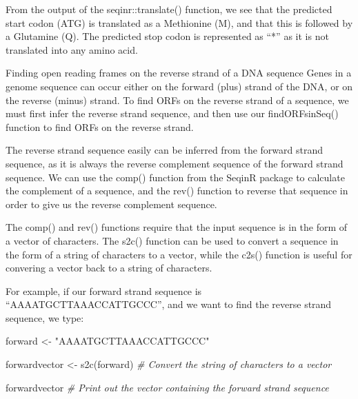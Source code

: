\documentclass[
]{book}
\newenvironment{Shaded}{\begin{snugshade}}{\end{snugshade}}
\newcommand{\CommentTok}[1]{\textcolor[rgb]{0.56,0.35,0.01}{\textit{#1}}}
\newcommand{\FunctionTok}[1]{\textcolor[rgb]{0.00,0.00,0.00}{#1}}
\newcommand{\NormalTok}[1]{#1}
\newcommand{\OtherTok}[1]{\textcolor[rgb]{0.56,0.35,0.01}{#1}}
\newcommand{\StringTok}[1]{\textcolor[rgb]{0.31,0.60,0.02}{#1}}
\begin{document}
From the output of the seqinr::translate() function, we see that the predicted start codon (ATG) is translated as a Methionine (M), and that this is followed by a Glutamine (Q). The predicted stop codon is represented as ``*'' as it is not translated into any amino acid.

Finding open reading frames on the reverse strand of a DNA sequence
Genes in a genome sequence can occur either on the forward (plus) strand of the DNA, or on the reverse (minus) strand. To find ORFs on the reverse strand of a sequence, we must first infer the reverse strand sequence, and then use our findORFsinSeq() function to find ORFs on the reverse strand.

The reverse strand sequence easily can be inferred from the forward strand sequence, as it is always the reverse complement sequence of the forward strand sequence. We can use the comp() function from the SeqinR package to calculate the complement of a sequence, and the rev() function to reverse that sequence in order to give us the reverse complement sequence.

The comp() and rev() functions require that the input sequence is in the form of a vector of characters. The s2c() function can be used to convert a sequence in the form of a string of characters to a vector, while the c2s() function is useful for convering a vector back to a string of characters.

For example, if our forward strand sequence is ``AAAATGCTTAAACCATTGCCC'', and we want to find the reverse strand sequence, we type:

\begin{Shaded}
\begin{Highlighting}[]
\NormalTok{forward }\OtherTok{\textless{}{-}} \StringTok{"AAAATGCTTAAACCATTGCCC"}
\end{Highlighting}
\end{Shaded}

\begin{Shaded}
\begin{Highlighting}[]
\NormalTok{forwardvector }\OtherTok{\textless{}{-}} \FunctionTok{s2c}\NormalTok{(forward)                }\CommentTok{\# Convert the string of characters to a vector}
\end{Highlighting}
\end{Shaded}

\begin{Shaded}
\begin{Highlighting}[]
\NormalTok{forwardvector                                }\CommentTok{\# Print out the vector containing the forward strand sequence}
\end{Highlighting}
\end{Shaded}
\end{document}
